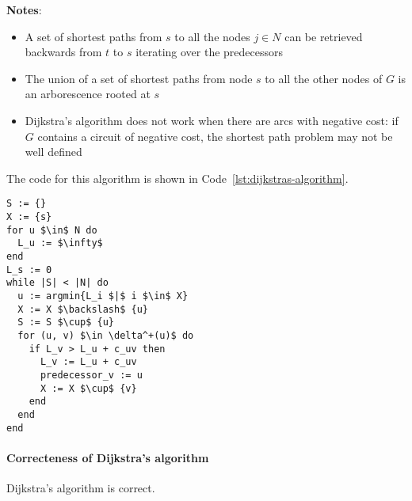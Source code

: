 \documentclass[english]{article}
\begin{document}
\bigskip
\textbf{Notes}:
\begin{itemize}
  \item A set of shortest paths from \(s\) to all the nodes \(j \in N\) can be retrieved backwards from \(t\) to \(s\) iterating over the predecessors
  \item The union of a set of shortest paths from node \(s\) to all the other nodes of \(G\) is an arborescence rooted at \(s\)
  \item Dijkstra's algorithm does not work when there are arcs with negative cost: if \(G\) contains a circuit of negative cost, the shortest path problem may not be well defined
\end{itemize}

\bigskip
The code for this algorithm is shown in Code~\ref{lst:dijkstras-algorithm}.

\begin{lstlisting}[style=custom, language=pseudocode, caption={Dijkstra's algorithm}, label={lst:dijkstras-algorithm}]
S := {}
X := {s}
for u $\in$ N do
  L_u := $\infty$
end
L_s := 0
while |S| < |N| do
  u := argmin{L_i $|$ i $\in$ X}
  X := X $\backslash$ {u}
  S := S $\cup$ {u}
  for (u, v) $\in \delta^+(u)$ do
    if L_v > L_u + c_uv then
      L_v := L_u + c_uv
      predecessor_v := u
      X := X $\cup$ {v}
    end
  end
end
\end{lstlisting}

\paragraph{Correcteness of Dijkstra's algorithm}

Dijkstra's algorithm is correct.
\end{document}

